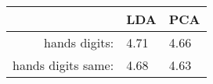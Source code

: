 \begin{tabular}{|r|l|l|}
  \hline
    & LDA & PCA \\
  \hline
  hands digits: & 4.71 & 4.66 \\
  \hline
  hands digits same: & 4.68 & 4.63 \\
  \hline
\end{tabular}
